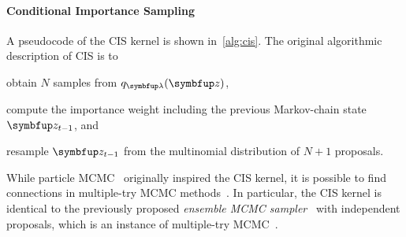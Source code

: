 \paragraph{Conditional Importance Sampling}
A pseudocode of the CIS kernel is shown in~\cref{alg:cis}.
The original algorithmic description of CIS is to
\begin{enumerate*}[label=(\roman*)]
  \item obtain \(N\) samples from \(q_{\vlambda}(\vz)\),
  \item compute the importance weight including the previous Markov-chain state \(\vz_{t-1}\), and 
  \item resample \(\vz_{t-1}\) from the multinomial distribution of \(N+1\) proposals.
\end{enumerate*}
%
While particle MCMC~\citep{andrieu_particle_2010} originally inspired the CIS kernel, it is possible to find connections in multiple-try MCMC methods~\citep{martino_review_2018}.
In particular, the CIS kernel is identical to the previously proposed \textit{ensemble MCMC sampler}~\citep{austad_parallel_2007, neal_mcmc_2011a} with independent proposals, which is an instance of multiple-try MCMC~\citep[Table 12]{martino_review_2018}.

\vspace{-0.1in}
